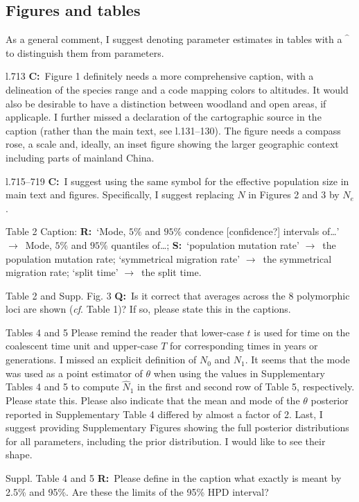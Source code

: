 \documentclass[11pt]{article}
\newenvironment{my_description}
{\begin{description}
  \setlength{\itemsep}{2pt}
  \setlength{\parskip}{0pt}
  \setlength{\parsep}{0pt}}
{\end{description}}
\newcommand{\ra}{$\rightarrow$\ }
\newcommand{\C}{\textbf{C:}\ }
\newcommand{\Q}{\textbf{Q:}\ }
\newcommand{\R}{\textbf{R:}\ }
\newcommand{\V}{\textbf{S:}\ }
\begin{document}
\subsection{Figures and tables}
As a general comment, I suggest denoting parameter estimates in tables with a $\hat{\phantom{t}}$ to distinguish them from parameters.
\begin{my_description}
\item[l.713] \C Figure 1 definitely needs a more comprehensive caption, with a delineation of the species range and a code mapping colors to altitudes. It would also be desirable to have a distinction between woodland and open areas, if applicaple. I further missed a declaration of the cartographic source in the caption (rather than the main text, see l.131--130). The figure needs a compass rose, a scale and, ideally, an inset figure showing the larger geographic context including parts of mainland China.
	\item[l.715--719] \C I suggest using the same symbol for the effective population size in main text and figures. Specifically, I suggest replacing $N$ in Figures 2 and 3 by $N_e$.
	\item[Table 2] Caption: \R `Mode, $5\%$ and $95\%$ condence [confidence?] intervals of\dots' \ra Mode, $5\%$ and $95\%$ quantiles of\dots; \V `population mutation rate' \ra the population mutation rate; `symmetrical migration rate' \ra the symmetrical migration rate; `split time' \ra the split time.
	\item[Table 2 and Supp. Fig. 3]  \Q Is it correct that averages across the 8 polymorphic loci are shown (\emph{cf}. Table 1)? If so, please state this in the captions.
	\item[Tables 4 and 5] Please remind the reader that lower-case $t$ is used for time on the coalescent time unit and upper-case $T$ for corresponding times in years or generations. I missed an explicit definition of $N_0$ and $N_1$. It seems that the mode was used as a point estimator of $\theta$ when using the values in Supplementary Tables 4 and 5 to compute $\hat{N}_1$ in the first and second row of Table 5, respectively. Please state this. Please also indicate that the mean and mode of the $\theta$ posterior reported in Supplementary Table 4 differed by almost a factor of 2.  Last, I suggest providing Supplementary Figures showing the full posterior distributions for all parameters, including the prior distribution. I would like to see their shape.
	\item[Suppl. Table 4 and 5] \R Please define in the caption what exactly is meant by 2.5\% and 95\%. Are these the limits of the 95\% HPD interval?
\end{my_description}
\end{document}
